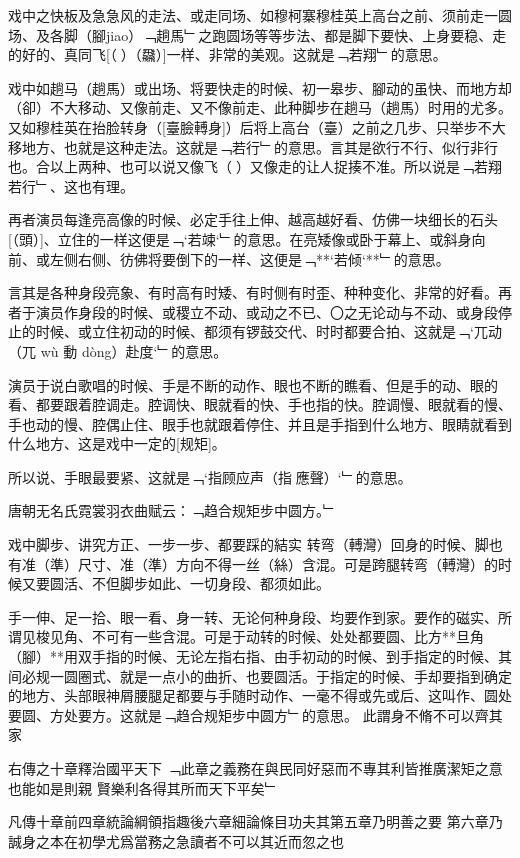 \documentclass{zhvt-classic}
\begin{document}
戏中之快板及急急风的走法、或走同场、如穆柯寨穆桂英上高台之前、须前走一圆场、及各脚（腳jiao）﹁趟馬﹂之跑圆场等等步法、都是脚下要快、上身要稳、走的好的、真同飞[（𮸽）（飝）]一样、非常的美观。这就是﹁若翔﹂的意思。

戏中如趟马（趟馬）或出场、将要快走的时候、初一皋步、腳动的虽快、而地方却（卻）不大移动、又像前走、又不像前走、此种脚步在趟马（趟馬）时用的尤多。又如穆桂英在抬脸转身（[臺臉𨍭身]）后将上高台（臺）之前之几步、只举步不大移地方、也就是这种走法。这就是﹁若行﹂的意思。言其是欲行不行、似行非行也。合以上两种、也可以说又像飞（𮸽）又像走的让人捉揍不准。所以说是﹁若翔若行﹂、这也有理。

再者演员每逢亮高像的时候、必定手往上伸、越高越好看、仿佛一块细长的石头[（頭）]、立住的一样这便是﹁`若竦`﹂的意思。在亮矮像或卧于幕上、或斜身向前、或左侧右侧、彷佛将要倒下的一样、这便是﹁**`若倾`**﹂的意思。

言其是各种身段亮象、有时高有时矮、有时侧有时歪、种种变化、非常的好看。再者于演员作身段的时候、或稷立不动、或动之不已、〇之无论动与不动、或身段停止的时候、或立住初动的时候、都须有锣鼓交代、时时都要合拍、这就是﹁`兀动（兀 wù 動 dòng）赴度`﹂的意思。

演员于说白歌唱的时候、手是不断的动作、眼也不断的瞧看、但是手的动、眼的看、都要跟着腔调走。腔调快、眼就看的快、手也指的快。腔调慢、眼就看的慢、手也动的慢、腔偶止住、眼手也就跟着停住、并且是手指到什么地方、眼睛就看到什么地方、这是戏中一定的[规矩]。

所以说、手眼最要紧、这就是﹁`指顾应声（指𮸹應聲）`﹂的意思。

\begin{preface}
  唐朝无名氏霓裳羽衣曲赋云：﹁趋合规矩步中圆方。﹂
\end{preface}

戏中脚步、讲究方正、一步一步、都要踩的結实 转弯（𨍭灣）回身的时候、脚也有准（準）尺寸、准（準）方向不得一丝（絲）含混。可是跨腿转弯（𨍭灣）的时候又要圆活、不但脚步如此、一切身段、都须如此。

手一伸、足一拾、眼一看、身一转、无论何种身段、均要作到家。要作的磁实、所谓见梭见角、不可有一些含混。可是于动转的时候、处处都要圆、比方**旦角（腳）**用双手指的时候、无论左指右指、由手初动的时候、到手指定的时候、其间必规一圆圈式、就是一点小的曲折、也要圆活。于指定的时候、手却要指到确定的地方、头部眼神屑腰腿足都要与手随时动作、一毫不得或先或后、这叫作、圆处要圆、方处要方。这就是﹁趋合规矩步中圆方﹂的意思。
此謂身不脩不可以齊其家

\begin{preface}
右傳之十章釋治國平天下
  ﹁此章之義務在與民同好惡而不專其利皆推廣潔矩之意也能如是則親
    賢樂利各得其所而天下平矣﹂

凡傳十章前四章統論綱領指趣後六章細論條目功夫其第五章乃明善之要
第六章乃誠身之本在初學尤爲當務之急讀者不可以其近而忽之也
\end{preface}
\end{document}
